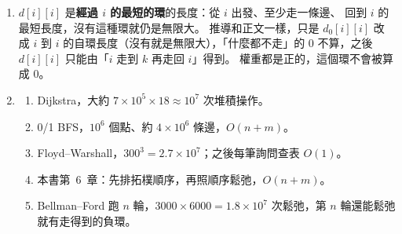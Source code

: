 \begin{enumerate}
\item $d[i][i]$ 是\textbf{經過 $i$ 的最短的環}的長度：從 $i$ 出發、至少走一條邊、
回到 $i$ 的最短長度，沒有這種環就仍是無限大。 推導和正文一樣，只是 $d_0[i][i]$ 改
成 $i$ 到 $i$ 的自環長度（沒有就是無限大），「什麼都不走」的 $0$ 不算，之後 $d[i][i]$
只能由「$i$ 走到 $k$ 再走回 $i$」得到。 權重都是正的，這個環不會被算成 $0$。

\item
\begin{enumerate}
\item Dijkstra，大約 $7 \times 10^5 \times 18 \approx 10^7$ 次堆積操作。
\item 0/1 BFS，$10^6$ 個點、約 $4 \times 10^6$ 條邊，$O(n + m)$。
\item Floyd--Warshall，$300^3 = 2.7 \times 10^7$；之後每筆詢問查表 $O(1)$。
\item 本書第~6~章：先排拓樸順序，再照順序鬆弛，$O(n + m)$。
\item Bellman--Ford 跑 $n$ 輪，$3000 \times 6000 = 1.8 \times 10^7$ 次鬆弛，第 $n$
輪還能鬆弛就有走得到的負環。
\end{enumerate}
\end{enumerate}
